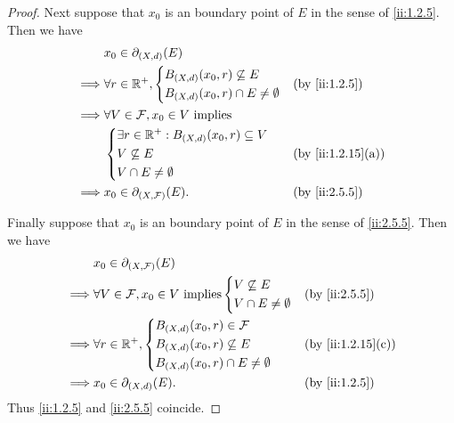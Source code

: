 \begin{proof}
  Next suppose that \(x_0\) is an boundary point of \(E\) in the sense of \cref{ii:1.2.5}.
  Then we have
  \begin{align*}
             & x_0 \in \partial_{(X, d)}(E)                                           \\
    \implies & \forall r \in \R^+, \begin{dcases}
                                     B_{(X, d)}(x_0, r) \not\subseteq E \\
                                     B_{(X, d)}(x_0, r) \cap E \neq \emptyset
                                   \end{dcases}               &  & \by{ii:1.2.5}         \\
    \implies & \forall V \in \mathcal{F}, x_0 \in V \text{ implies}                   \\
             & \begin{dcases}
                 \exists r \in \R^+ : B_{(X, d)}(x_0, r) \subseteq V \\
                 V \not\subseteq E                                   \\
                 V \cap E \neq \emptyset
               \end{dcases} &  & \by{ii:1.2.15}[a]                    \\
    \implies & x_0 \in \partial_{(X, \mathcal{F})}(E).                &  & \by{ii:2.5.5}
  \end{align*}

  Finally suppose that \(x_0\) is an boundary point of \(E\) in the sense of \cref{ii:2.5.5}.
  Then we have
  \begin{align*}
             & x_0 \in \partial_{(X, \mathcal{F})}(E)                                              \\
    \implies & \forall V \in \mathcal{F}, x_0 \in V \text{ implies} \begin{dcases}
                                                                      V \not\subseteq E \\
                                                                      V \cap E \neq \emptyset
                                                                    \end{dcases} &  & \by{ii:2.5.5}   \\
    \implies & \forall r \in \R^+, \begin{dcases}
                                     B_{(X, d)}(x_0, r) \in \mathcal{F} \\
                                     B_{(X, d)}(x_0, r) \not\subseteq E \\
                                     B_{(X, d)}(x_0, r) \cap E \neq \emptyset
                                   \end{dcases}                            &  & \by{ii:1.2.15}[c]     \\
    \implies & x_0 \in \partial_{(X, d)}(E).                                       &  & \by{ii:1.2.5}
  \end{align*}
  Thus \cref{ii:1.2.5} and \cref{ii:2.5.5} coincide.
\end{proof}

